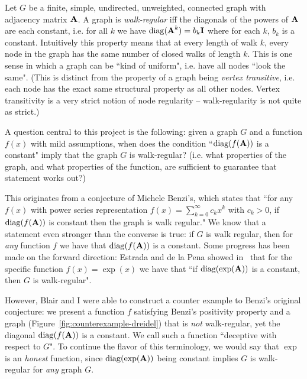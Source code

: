 

Let $G$ be a finite, simple, undirected, unweighted, connected graph with adjacency matrix $\textbf{A}$.
A graph is \emph{walk-regular} iff the diagonals of the powers of $\textbf{A}$ are each constant, i.e. for all $k$ we have $\operatorname{diag}( \textbf{A}^k ) = b_k \textbf{I}$ where for each $k$, $b_k$ is a constant. Intuitively this property means that at every length of walk $k$, every node in the graph has the same number of closed walks of length $k$. This is one sense in which a graph can be ``kind of uniform", i.e. have all nodes ``look the same". (This is distinct from the property of a graph being \emph{vertex transitive}, i.e. each node has the exact same structural property as all other nodes. Vertex transitivity is a very strict notion of node regularity -- walk-regularity is not quite as strict.)


A question central to this project is the following: given a graph $G$ and a function $f(x)$ with mild assumptions, when does the condition ``$\operatorname{diag}( f(\textbf{A}) )$ is a constant" imply that the graph $G$ is walk-regular? (i.e. what properties of the graph, and what properties of the function, are sufficient to guarantee that statement works out?)

This originates from a conjecture of Michele Benzi's, which states that ``for any $f(x)$ with power series representation $f(x) = \sum_{k=0}^{\infty} c_k x^k$ with $c_k > 0$, if $\operatorname{diag}( f(\textbf{A}) )$ is constant then the graph is walk regular."
We know that a statement even stronger than the converse is true: if $G$ is walk regular, then for \emph{any} function $f$ we have that $\operatorname{diag}(f(\textbf{A}))$ is a constant.
Some progress has been made on the forward direction: Estrada and de la Pena showed in~\cite{estrada2014maximum} that for the specific function $f(x) = \exp(x)$ we have that ``if $\operatorname{diag}(\exp(\textbf{A}))$ is a constant, then $G$ is walk-regular".

However, Blair and I were able to construct a counter example to Benzi's original conjecture: we present a function $f$ satisfying Benzi's positivity property and a graph (Figure~\ref{fig:counterexample-dreidel}) that is \emph{not} walk-regular, yet the diagonal $\operatorname{diag}(f(\textbf{A}))$ is a constant. We call such a function ``deceptive with respect to $G$". To continue the flavor of this terminology, we would say that $\exp$ is an \emph{honest} function, since $\operatorname{diag}(\exp(\textbf{A}))$ being constant implies $G$ is walk-regular for \emph{any} graph $G$.

